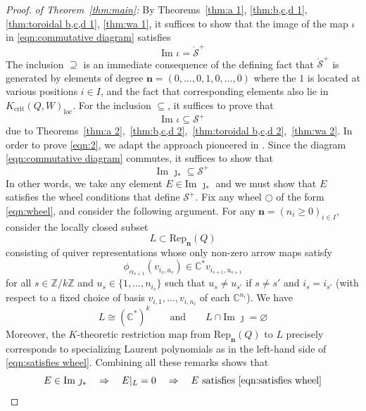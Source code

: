\documentclass{amsart}
\def\BC{{\mathbb{C}}}
\def\BZ{{\mathbb{Z}}}
\def\CS{{\mathcal{S}}}
\def\bn{{\boldsymbol{n}}}
\def\oCS{\mathring{\CS}}
\begin{document}
\medskip 

\begin{proof} \emph{of Theorem~\ref{thm:main}:} By Theorems~\ref{thm:a 1}, \ref{thm:b,c,d 1}, \ref{thm:toroidal b,c,d 1}, \ref{thm:wa 1}, it suffices to show that the image of the map $\iota$ in \eqref{eqn:commutative diagram} satisfies
\begin{equation}
\label{eqn:1}
\text{Im } \iota = \oCS^+
\end{equation}
The inclusion $\supseteq$ is an immediate consequence of the defining fact that $\oCS^+$ is generated by elements of degree $\bn = (0,\dots,0,1,0,\dots,0)$ where the $1$ is located at various positions $i \in I$, and the fact that corresponding elements also lie in $K_{\text{crit}}(Q,W)_{\text{loc}}$. For the inclusion $\subseteq$, it suffices to prove that
\begin{equation}
\label{eqn:2}
\text{Im }\iota \subseteq \CS^+ 
\end{equation}
due to Theorems~\ref{thm:a 2},~\ref{thm:b,c,d 2},~\ref{thm:toroidal b,c,d 2},~\ref{thm:wa 2}. In order to prove \eqref{eqn:2}, we adapt the approach pioneered in \cite{Z}. Since the diagram \eqref{eqn:commutative diagram} commutes, it suffices to show that
\begin{equation}
\label{eqn:3}
\text{Im }\jmath_* \subseteq \CS^+ 
\end{equation} 
In other words, we take any element $E \in \text{Im }\jmath_*$ and we must show that $E$ satisfies the wheel conditions that define $\CS^+$. Fix any wheel $\bigcirc$ of the form \eqref{eqn:wheel}, and consider the following argument. For any $\bn = (n_i \geq 0)_{i \in I}$, consider the locally closed subset
\[
L \subset \text{Rep}_{\bn}(Q)
\]
consisting of quiver representations whose only non-zero arrow maps satisfy
\[
\phi_{\alpha_{s+1}}(v_{i_s,u_s}) \in \BC^* v_{i_{s+1},u_{s+1}}
\]
for all $s \in \BZ/k\BZ$ and $u_s \in \{1,\dots,n_{i_s}\}$ such that $u_s \neq u_{s'}$ if $s \neq s'$ and $i_s = i_{s'}$ (with respect to a fixed choice of basis $v_{i,1},\dots,v_{i,n_i}$ of each $\BC^{n_i}$). We have 
\[
L \cong (\BC^*)^k \qquad \text{and} \qquad L \cap \text{Im }\jmath = \varnothing
\]
Moreover, the $K$-theoretic restriction map from $\text{Rep}_{\bn}(Q)$ to $L$ precisely corresponds to specializing Laurent polynomials as in the left-hand side of \eqref{eqn:satisfies wheel}. Combining all these remarks shows that
\begin{equation}
\label{eqn:chain}
E \in \text{Im }\jmath_* \quad \Rightarrow \quad E|_L = 0 \quad \Rightarrow \quad E \text{ satisfies } \eqref{eqn:satisfies wheel}

\end{equation}
\end{proof}
\end{document}
